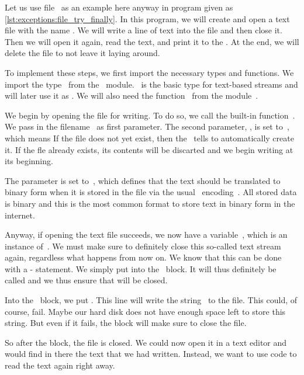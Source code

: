 Let us use file~ as an example here anyway in program  given as \cref{lst:exceptions:file_try_finally}.
In this program, we will create and open a text file with the name .
We will write a line of text into the file and then close it.
Then we will open it again, read the text, and print it to the .
At the end, we will delete the file to not leave it laying around.

To implement these steps, we first import the necessary types and functions.
We import the type~ from the ~module.
~is the basic type for text-based  streams and will later use it as .
We will also need the function~ from the module~.

We begin by opening the file  for writing.
To do so, we call the built-in function~.
We pass in the filename~ as first parameter.
The second parameter, , is set to~, which means 
If the file does not yet exist, then the~ tells  to automatically create it.
If the fle already exists, its contents will be discarted and we begin writing at its beginning.

The parameter  is set to~, which defines that the text should be translated to binary form when it is stored in the file via the usual ~encoding~\cite{RFC3629,ISOIEC106462020ITUCCSU}.
All stored data is binary and this is the most common format to store text in binary form in the internet.

Anyway, if opening the text file succeeds, we now have a variable~, which is an instance of~.
We must make sure to definitely close this so-called text stream again, regardless what happens from now on.
We know that this can be done with a - statement.
We simply put  into the ~block.
It will thus definitely be called and we thus ensure that  will be closed.%
%
\begin{sloppypar}%
Into the ~block, we put .
This line will write the string~ to the file.
This could, of course, fail.
Maybe our hard disk does not have enough space left to store this string.
But even if it fails, the  block will make sure to close the file.%
\end{sloppypar}%
%
So after the block, the file is closed.
We could now open it in a text editor and would find in there the text that we had written.
Instead, we want to use code to read the text again right away.

